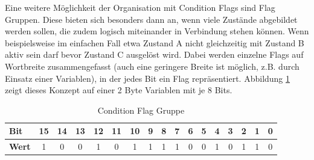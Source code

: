 \documentclass{llncs}
\begin{document}
Eine weitere Möglichkeit der Organisation mit Condition Flags sind Flag Gruppen. Diese bieten sich besonders dann an, wenn viele Zustände abgebildet werden sollen, die zudem logisch miteinander in Verbindung stehen können. Wenn beispielsweise im einfachen Fall etwa Zustand A nicht gleichzeitig mit Zustand B aktiv sein darf bevor Zustand C ausgelöst wird. Dabei werden einzelne Flags auf Wortbreite zusammengefasst (auch eine geringere Breite ist möglich, z.B. durch Einsatz einer Variablen), in der jedes Bit ein Flag repräsentiert. Abbildung \ref{tab:FlagGroup} zeigt dieses Konzept auf einer 2 Byte Variablen mit je 8 Bits.\\
\begin{table}[h]
	\centering %
	\def\arraystretch{1.5} %
	\setlength{\tabcolsep}{0.5em} %
		\begin{tabular}[h]{|l|c|c|c|c|c|c|c|c|c|c|c|c|c|c|c|c|}
			\hline
			\textbf{Bit} & \cellcolor{hellgrau}15 & \cellcolor{hellgrau}14 & \cellcolor{hellgrau}13 & \cellcolor{hellgrau}12 & \cellcolor{hellgrau}11 & \cellcolor{hellgrau}10 & \cellcolor{hellgrau}9 & \cellcolor{hellgrau}8 & \cellcolor{hellgrau}7 & \cellcolor{hellgrau}6 & \cellcolor{hellgrau}5 & \cellcolor{hellgrau}4 & \cellcolor{hellgrau}3 & \cellcolor{hellgrau}2 & \cellcolor{hellgrau}1 & \cellcolor{hellgrau}0 \\
			\hline
			\textbf{Wert} & 1 & 0 & 0 & 1 & 0 & 1 & 1 & 1 & 1 & 0 & 0 & 1 & 0 & 1 & 1 & 0 \\
			\hline
	\end{tabular}%
	\caption{\label{tab:FlagGroup} Condition Flag Gruppe \autocite[vgl.][85]{Cooling2017}}
\end{table}
\end{document}
